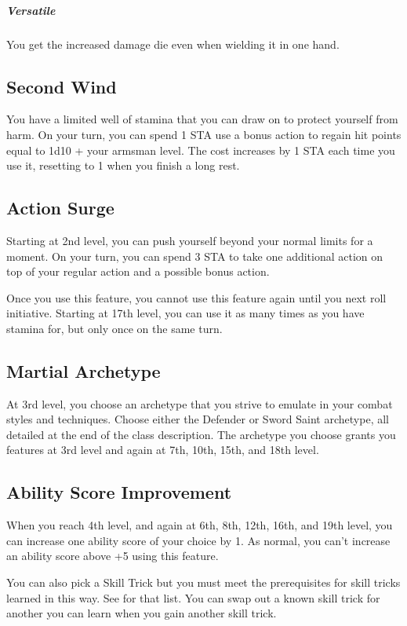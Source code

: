 \subparagraph*{Versatile} You get the increased damage die even when wielding it in one hand.

\subsection{Second Wind}

You have a limited well of stamina that you can draw on to protect yourself from harm. On your turn, you can spend 1 STA use a bonus action to regain hit points equal to 1d10 + your armsman level. The cost increases by 1 STA each time you use it, resetting to 1 when you finish a long rest.

\subsection{Action Surge}

Starting at 2nd level, you can push yourself beyond your normal limits for a moment. On your turn, you can spend 3 STA to take one additional action on top of your regular action and a possible bonus action.

Once you use this feature, you cannot use this feature again until you next roll initiative. Starting at 17th level, you can use it as many times as you have stamina for, but only once on the same turn.

\subsection{Martial Archetype}

At 3rd level, you choose an archetype that you strive to emulate in your combat styles and techniques. Choose either the Defender or Sword Saint archetype, all detailed at the end of the class description. The archetype you choose grants you features at 3rd level and again at 7th, 10th, 15th, and 18th level.

\subsection{Ability Score Improvement}

When you reach 4th level, and again at 6th, 8th, 12th, 16th, and 19th level, you can increase one ability score of your choice by 1. As normal, you can't increase an ability score above +5 using this feature.

You can also pick a Skill Trick but you must meet the prerequisites for skill tricks learned in this way. See  for that list. You can swap out a known skill trick for another you can learn when you gain another skill trick.

